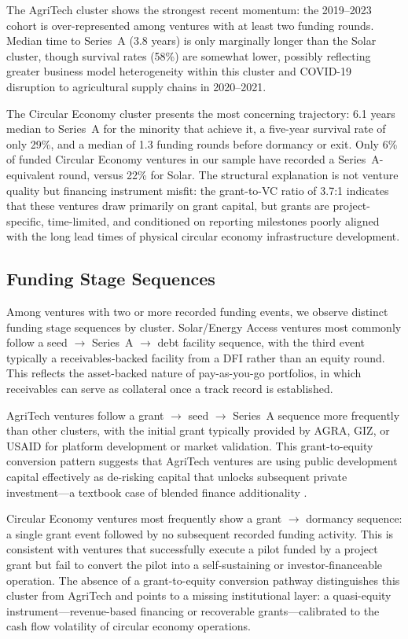 \documentclass[review,12pt]{elsarticle}
\begin{document}
The AgriTech cluster shows the strongest recent momentum: the
2019--2023 cohort is over-represented among ventures with at least
two funding rounds. Median time to Series~A (3.8 years) is only
marginally longer than the Solar cluster, though survival rates
(58\%) are somewhat lower, possibly reflecting greater business model
heterogeneity within this cluster and COVID-19 disruption to
agricultural supply chains in 2020--2021.

The Circular Economy cluster presents the most concerning trajectory:
6.1 years median to Series~A for the minority that achieve it, a
five-year survival rate of only 29\%, and a median of 1.3 funding
rounds before dormancy or exit. Only 6\% of funded Circular Economy
ventures in our sample have recorded a Series~A-equivalent round,
versus 22\% for Solar. The structural explanation is not venture
quality but financing instrument misfit: the grant-to-VC ratio of
3.7:1 indicates that these ventures draw primarily on grant capital,
but grants are project-specific, time-limited, and conditioned on
reporting milestones poorly aligned with the long lead times of
physical circular economy infrastructure development.

\subsection{Funding Stage Sequences}

Among ventures with two or more recorded funding events, we observe
distinct funding stage sequences by cluster. Solar/Energy Access
ventures most commonly follow a seed $\to$ Series~A $\to$ debt
facility sequence, with the third event typically a receivables-backed
facility from a DFI rather than an equity round. This reflects the
asset-backed nature of pay-as-you-go portfolios, in which receivables
can serve as collateral once a track record is established.

AgriTech ventures follow a grant $\to$ seed $\to$ Series~A sequence
more frequently than other clusters, with the initial grant typically
provided by AGRA, GIZ, or USAID for platform development or market
validation. This grant-to-equity conversion pattern suggests that
AgriTech ventures are using public development capital effectively
as de-risking capital that unlocks subsequent private investment---a
textbook case of blended finance additionality
\citep{reimsbach2022blended}.

Circular Economy ventures most frequently show a grant $\to$ dormancy
sequence: a single grant event followed by no subsequent recorded
funding activity. This is consistent with ventures that successfully
execute a pilot funded by a project grant but fail to convert the
pilot into a self-sustaining or investor-financeable operation.
The absence of a grant-to-equity conversion pathway distinguishes
this cluster from AgriTech and points to a missing institutional
layer: a quasi-equity instrument---revenue-based financing or
recoverable grants---calibrated to the cash flow volatility of
circular economy operations.
\end{document}
